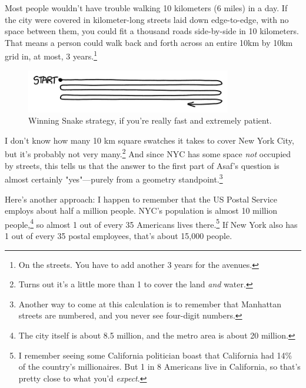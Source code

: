 {{Most people wouldn't have trouble walking 10 kilometers (6 miles) in a day. If the city were covered in kilometer-long streets laid down edge-to-edge, with no space between them, you could fit a thousand roads side-by-side in 10 kilometers. That means a person could walk back and forth across an entire 10km by 10km grid in, at most, 3 years.{\footnote{On the streets. You have to add another 3 years for the avenues.} } }

\begin{figure}[!htbp]
\centering
\includegraphics[scale=0.5, max width=0.8\textwidth]{imgs/a/110/backandforth.png}
\caption{Winning Snake strategy, if you're really fast and extremely patient.}
\end{figure}

{I don't know how many 10 km square swatches it takes to cover New York City, but it's probably not very many.{\footnote{Turns out it's a little more than 1 to cover the land \emph{and} water.} } And since NYC has some space \emph{not} occupied by streets, this tells us that the answer to the first part of Asaf's question is almost certainly "yes"—purely from a geometry standpoint.{\footnote{Another way to come at this calculation is to remember that Manhattan streets are numbered, and you never see four-digit numbers.} } }

{Here's another approach: I happen to remember that the US Postal Service employs about half a million people. NYC's population is almost 10 million people,{\footnote{The city itself is about 8.5 million, and the metro area is about 20 million.} } so almost 1 out of every 35 Americans lives there.{\footnote{I remember seeing some California politician boast that California had 14\% of the country's millionaires. But 1 in 8 Americans live in California, so that's pretty close to what you'd \emph{expect}.} } If New York also has 1 out of every 35 postal employees, that's about 15,000 people.}

}
